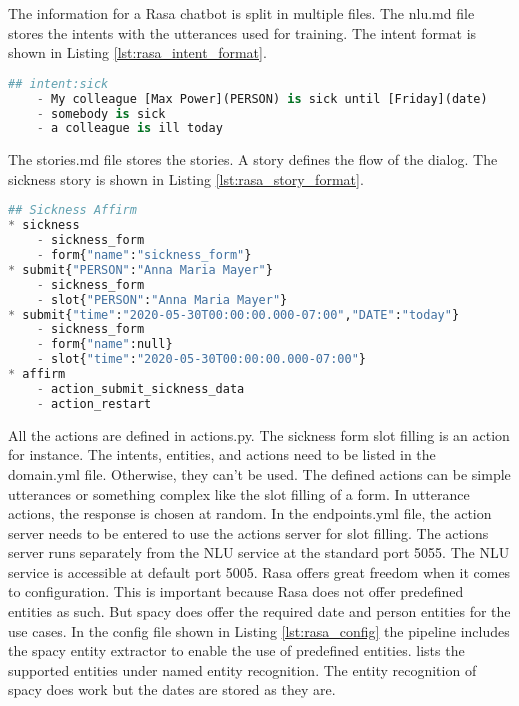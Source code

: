 The information for a Rasa chatbot is split in multiple files.
The nlu.md file stores the intents with the utterances used for training.
The intent format is shown in Listing \ref{lst:rasa_intent_format}.
\begin{lstlisting}[caption={Rasa Intent Format}, label={lst:rasa_intent_format},captionpos=b,frame=single,language={Python},commentstyle=\color{mygreen},keywordstyle=\color{blue},
    morekeywords={}]                
## intent:sick
    - My colleague [Max Power](PERSON) is sick until [Friday](date)
    - somebody is sick 
    - a colleague is ill today
\end{lstlisting} 
The stories.md file stores the stories. 
A story defines the flow of the dialog.
The sickness story is shown in Listing \ref{lst:rasa_story_format}.
\begin{lstlisting}[caption={Rasa Story Format}, label={lst:rasa_story_format},captionpos=b,frame=single,language={Python},commentstyle=\color{mygreen},keywordstyle=\color{blue},
    morekeywords={sickness, submit, affirm}]                
## Sickness Affirm
* sickness
    - sickness_form
    - form{"name":"sickness_form"}
* submit{"PERSON":"Anna Maria Mayer"}
    - sickness_form
    - slot{"PERSON":"Anna Maria Mayer"}
* submit{"time":"2020-05-30T00:00:00.000-07:00","DATE":"today"}
    - sickness_form
    - form{"name":null}
    - slot{"time":"2020-05-30T00:00:00.000-07:00"}
* affirm
    - action_submit_sickness_data
    - action_restart
\end{lstlisting} 
All the actions are defined in actions.py.
The sickness form slot filling is an action for instance.
The intents, entities, and actions need to be listed in the domain.yml file.
Otherwise, they can't be used. 
The defined actions can be simple utterances or something complex like the slot filling of a form.
In utterance actions, the response is chosen at random.
In the endpoints.yml file, the action server needs to be entered to use the actions server for slot filling.
The actions server runs separately from the NLU service at the standard port 5055.
The NLU service is accessible at default port 5005.
Rasa offers great freedom when it comes to configuration.
This is important because Rasa does not offer predefined entities as such.
But spacy does offer the required date and person entities for the use cases.
In the config file shown in Listing \ref{lst:rasa_config} the pipeline includes the spacy entity extractor to enable the use of predefined entities.
\citet{spacyapi} lists the supported entities under named entity recognition.
The entity recognition of spacy does work but the dates are stored as they are.

